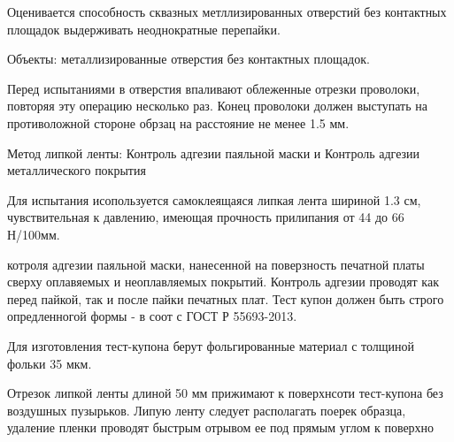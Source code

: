 \documentclass{article}
\begin{document}
Оценивается способность сквазных метллизированных отверстий без контактных площадок выдерживать неоднократные перепайки.

Объекты: металлизированные отверстия без контактных площадок.

Перед испытаниями в отверстия впаливают облеженные отрезки проволоки, повторяя эту операцию несколько раз. Конец проволоки должен выступать на противоложной стороне обрзац на расстояние не менее 1.5 мм.

Метод липкой ленты: Контроль адгезии паяльной маски и Контроль адгезии металлического покрытия

Для испытания исопользуется самоклеящаяся липкая лента шириной 1.3 см, чувствительная к давлению, имеющая прочность прилипания от 44 до 66 Н/100мм.

котроля адгезии паяльной маски, нанесенной на поверзность печатной платы сверху оплавяемых и неоплавляемых покрытий. Контроль адгезии проводят как перед пайкой, так и после пайки печатных плат. Тест купон должен быть строго опредленногой формы - в соот с ГОСТ Р 55693-2013.

Для изготовления тест-купона берут фольгированные материал с толщиной фольки 35 мкм.

Отрезок липкой ленты длиной 50 мм прижимают к поверхнсоти тест-купона без воздушных пузырьков. Липую ленту следует располагать поерек образца, удаление пленки проводят быстрым отрывом ее под прямым углом к поверхно
\end{document}
